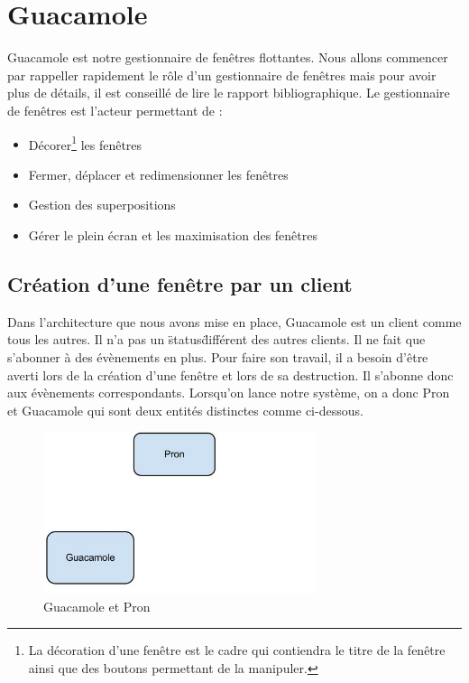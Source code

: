 \section{Guacamole}

Guacamole est notre gestionnaire de fenêtres flottantes.
Nous allons commencer par rappeller rapidement le rôle d'un gestionnaire de fenêtres mais pour avoir plus de détails, il est conseillé de lire le rapport bibliographique.
Le gestionnaire de fenêtres est l'acteur permettant de :

\begin{itemize}
  \item Décorer\footnote{La décoration d'une fenêtre est le cadre qui contiendra le titre de la fenêtre ainsi que des boutons permettant de la manipuler.} les fenêtres
  \item Fermer, déplacer et redimensionner les fenêtres
  \item Gestion des superpositions
  \item Gérer le plein écran et les maximisation des fenêtres
\end{itemize}

\subsection{Création d'une fenêtre par un client}


Dans l'architecture que nous avons mise en place, Guacamole est un client comme tous les autres.
Il n'a pas un \"status\" différent des autres clients.
Il ne fait que s'abonner à des évènements en plus.
Pour faire son travail, il a besoin d'être averti lors de la création d'une fenêtre et lors de sa destruction.
Il s'abonne donc aux évènements correspondants.
Lorsqu'on lance notre système, on a donc Pron et Guacamole qui sont deux entités distinctes comme ci-dessous.

\begin{figure}[H]
  \centering
  \includegraphics[width=8cm]{images/Guacamole_anim_1.jpg}
  \caption{Guacamole et Pron}
  \label{fig:guacamole_anim_1}
\end{figure}

